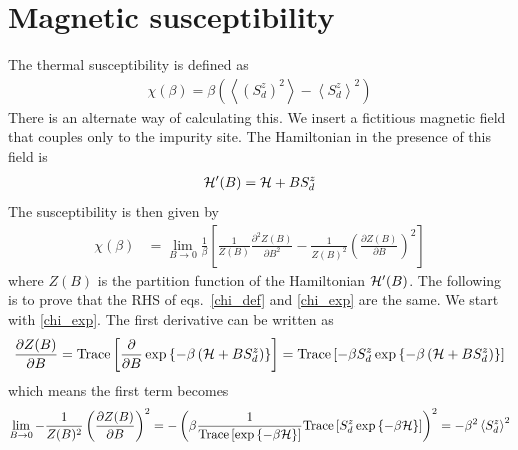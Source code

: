 \documentclass[12pt,twoside]{report}
\numberwithin{equation}{section}
\begin{document}
\section{Magnetic susceptibility}
The thermal susceptibility is defined as
\begin{equation}\begin{aligned}
	\label{chi_def}
	\chi(\beta) = \beta \left(\left<\left(S_d^z\right)^2\right> - \left<S_d^z\right>^2\right)
\end{aligned}\end{equation}
There is an alternate way of calculating this. We insert a fictitious magnetic field that couples only to the impurity site. The Hamiltonian in the presence of this field is
\begin{equation}\begin{aligned}
	\mathcal{H}^\prime(B) = \mathcal{H} + B S_d^z
\end{aligned}\end{equation}
The susceptibility is then given by
\begin{equation}\begin{aligned}
	\label{chi_exp}
	\chi(\beta) &= \lim_{B \to 0}\frac{1}{\beta}\left[\frac{1}{Z(B)} \frac{\partial^2{Z(B)}}{\partial{B^2}}-\frac{1}{Z(B)^2} \left(\frac{\partial{Z(B)}}{\partial{B}}\right)^2\right]
\end{aligned}\end{equation}
where \(Z(B)\) is the partition function of the Hamiltonian \(\mathcal{H}^\prime(B)\). The following is to prove that the RHS of eqs.~\ref{chi_def} and \ref{chi_exp} are the same. We start with \ref{chi_exp}. The first derivative can be written as
\begin{equation}\begin{aligned}
	\frac{\partial{Z(B)}}{\partial{B}} = \text{Trace}\left[\frac{\partial{}}{\partial{B}} \exp\left\{-\beta\left( \mathcal{H} + BS_d^z \right) \right\}\right] = \text{Trace}\left[-\beta S_d^z \exp\left\{-\beta\left( \mathcal{H} + BS_d^z \right) \right\}\right]
\end{aligned}\end{equation}
which means the first term becomes
\begin{equation}\begin{aligned}
	\lim_{B \to 0}-\frac{1}{Z(B)^2} \left(\frac{\partial{Z(B)}}{\partial{B}}\right)^2 = -\left(\beta \frac{1}{\text{Trace}\left[\exp\left\{-\beta\mathcal{H}\right\}\right]} \text{Trace}\left[S_d^z \exp\left\{-\beta\mathcal{H}\right\}\right]\right)^2 = -\beta^2 \left<S_d^z\right>^2
\end{aligned}\end{equation}
\end{document}
